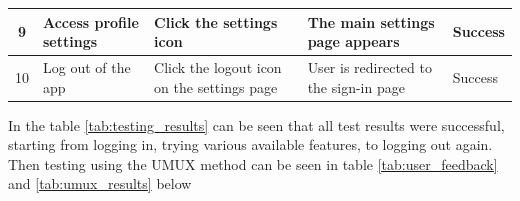 \documentclass[conference,a4paper]{IEEEtran}
\begin{document}
\begin{table}[htbp]
{\begin{tabular}{|c|l|l|l|l|}
      9            & Access profile settings            & Click the settings icon                                                               & The main settings page appears                            & Success         \\ \hline
      10           & Log out of the app                 & Click the logout icon on the settings page                                            & User is redirected to the sign-in page                    & Success         \\ \hline
    \end{tabular}%
  }
\end{table}

In the table \ref{tab:testing_results} can be seen that all test results were
successful, starting from logging in, trying various available features, to
logging out again. Then testing using the UMUX method can be seen in table
\ref{tab:user_feedback} and \ref{tab:umux_results} below

\begin{table}[htbp]
  \caption{UMUX QUESTION LIST \cite{b10}}
  \label{tab:user_feedback}
\end{table}
\end{document}
